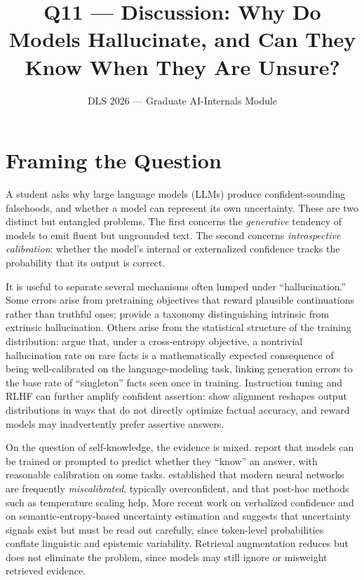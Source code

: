 \documentclass[11pt]{article}
\title{Q11 --- Discussion: Why Do Models Hallucinate, and Can They Know When They Are Unsure?}
\author{DLS 2026 --- Graduate AI-Internals Module}
\date{}
\begin{document}
\maketitle

\section*{Framing the Question}

A student asks why large language models (LLMs) produce confident-sounding
falsehoods, and whether a model can represent its own uncertainty. These are
two distinct but entangled problems. The first concerns the \emph{generative}
tendency of models to emit fluent but ungrounded text. The second concerns
\emph{introspective calibration}: whether the model's internal or externalized
confidence tracks the probability that its output is correct.

It is useful to separate several mechanisms often lumped under
``hallucination.'' Some errors arise from pretraining objectives that reward
plausible continuations rather than truthful ones; \citet{ji2023survey}
provide a taxonomy distinguishing intrinsic from extrinsic hallucination.
Others arise from the statistical structure of the training distribution:
\citet{kalai2024calibrated} argue that, under a cross-entropy objective, a
nontrivial hallucination rate on rare facts is a mathematically expected
consequence of being well-calibrated on the language-modeling task, linking
generation errors to the base rate of ``singleton'' facts seen once in
training. Instruction tuning and RLHF can further amplify confident assertion:
\citet{ouyang2022training} show alignment reshapes output distributions in ways
that do not directly optimize factual accuracy, and reward models may
inadvertently prefer assertive answers.

On the question of self-knowledge, the evidence is mixed. \citet{kadavath2022know}
report that models can be trained or prompted to predict whether they ``know''
an answer, with reasonable calibration on some tasks. \citet{guo2017calibration}
established that modern neural networks are frequently \emph{miscalibrated},
typically overconfident, and that post-hoc methods such as temperature scaling
help. More recent work on verbalized confidence \citep{lin2022teaching} and
on semantic-entropy-based uncertainty estimation \citep{kuhn2023semantic} and
\citep{farquhar2024detecting} suggests that uncertainty signals exist but must
be read out carefully, since token-level probabilities conflate linguistic
and epistemic variability. Retrieval augmentation \citep{lewis2020retrieval}
reduces but does not eliminate the problem, since models may still ignore or
misweight retrieved evidence.
\end{document}
